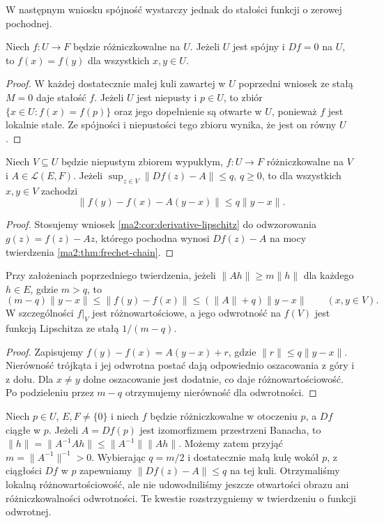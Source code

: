 W następnym wniosku spójność wystarczy jednak
do stałości funkcji o zerowej pochodnej.

\begin{wniosek}
\label{ma2:cor:zero-derivative}
Niech $f:U\to F$ będzie różniczkowalne na $U$.
Jeżeli $U$ jest spójny i $Df=0$ na $U$, to
$f(x)=f(y)$ dla wszystkich $x,y\in U$.
\end{wniosek}
\begin{proof}
W każdej dostatecznie małej kuli zawartej w $U$
poprzedni wniosek ze stałą $M=0$ daje stałość $f$.
Jeżeli $U$ jest niepusty i $p\in U$, to zbiór
$\{x\in U:f(x)=f(p)\}$ oraz jego dopełnienie są
otwarte w $U$, ponieważ $f$ jest lokalnie stałe.
Ze spójności i niepustości tego zbioru wynika,
że jest on równy $U$.
\end{proof}

\begin{twierdzenie}
\label{ma2:thm:linear-approximation-bound}
Niech $V\subseteq U$ będzie niepustym zbiorem wypukłym,
$f:U\to F$ różniczkowalne na $V$ i $A\in\mathcal L(E,F)$. Jeżeli
$\sup_{z\in V}\|Df(z)-A\|\le q$, $q\ge0$, to dla
wszystkich $x,y\in V$ zachodzi
\[
 \|f(y)-f(x)-A(y-x)\|\le q\|y-x\|.
\]
\end{twierdzenie}
\begin{proof}
Stosujemy wniosek \ref{ma2:cor:derivative-lipschitz}
do odwzorowania $g(z)=f(z)-Az$, którego pochodna
wynosi $Df(z)-A$ na mocy twierdzenia
\ref{ma2:thm:frechet-chain}.
\end{proof}

\begin{wniosek}
\label{ma2:cor:lower-increment}
Przy założeniach poprzedniego twierdzenia, jeżeli
$\|Ah\|\ge m\|h\|$ dla każdego $h\in E$, gdzie $m>q$,
to
\[
 (m-q)\|y-x\|\le\|f(y)-f(x)\|
 \le(\|A\|+q)\|y-x\|\qquad(x,y\in V).
\]
W szczególności $f|_V$ jest różnowartościowe, a jego
odwrotność na $f(V)$ jest funkcją Lipschitza ze
stałą $1/(m-q)$.
\end{wniosek}
\begin{proof}
Zapisujemy $f(y)-f(x)=A(y-x)+r$, gdzie
$\|r\|\le q\|y-x\|$. Nierówność trójkąta i jej
odwrotna postać dają odpowiednio oszacowania z góry
i z dołu. Dla $x\ne y$ dolne oszacowanie jest
dodatnie, co daje różnowartościowość. Po podzieleniu
przez $m-q$ otrzymujemy nierówność dla odwrotności.
\end{proof}

Niech $p\in U$, $E,F\ne\{0\}$ i niech $f$ będzie
różniczkowalne w otoczeniu $p$, a $Df$ ciągłe w $p$.
Jeżeli $A=Df(p)$ jest izomorfizmem przestrzeni Banacha,
to $\|h\|=\|A^{-1}Ah\|\le\|A^{-1}\|\|Ah\|$.
Możemy zatem przyjąć $m=\|A^{-1}\|^{-1}>0$.
Wybierając $q=m/2$ i dostatecznie małą kulę wokół
$p$, z ciągłości $Df$ w $p$ zapewniamy
$\|Df(z)-A\|\le q$ na tej kuli. Otrzymaliśmy lokalną
różnowartościowość, ale nie udowodniliśmy jeszcze
otwartości obrazu ani różniczkowalności odwrotności.
Te kwestie rozstrzygniemy w twierdzeniu o funkcji
odwrotnej.

